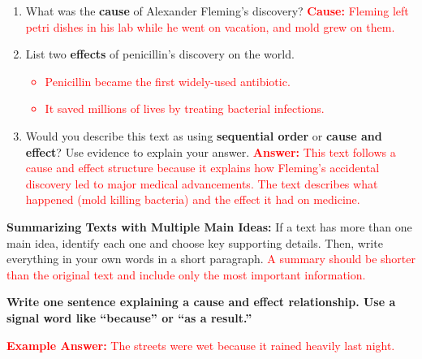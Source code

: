\documentclass[12pt]{article}
\begin{document}
\begin{tcolorbox}[colframe=black!60, colback=white, 
coltitle=black, colbacktitle=black!15, fonttitle=\bfseries\Large, 
title=Independent Practice, halign title=center, left=10pt, right=10pt, top=10pt, bottom=15pt]
\begin{enumerate}[itemsep=3em]
    \item What was the \textbf{cause} of Alexander Fleming’s discovery?  
    \textcolor{red}{\textbf{Cause:} Fleming left petri dishes in his lab while he went on vacation, and mold grew on them.}

    \item List two \textbf{effects} of penicillin’s discovery on the world.  
    \textcolor{red}{
        \begin{itemize}
            \item Penicillin became the first widely-used antibiotic.
            \item It saved millions of lives by treating bacterial infections.
        \end{itemize}
    }

    \item Would you describe this text as using \textbf{sequential order} or \textbf{cause and effect}? Use evidence to explain your answer.  
    \textcolor{red}{\textbf{Answer:} This text follows a cause and effect structure because it explains how Fleming’s accidental discovery led to major medical advancements. The text describes what happened (mold killing bacteria) and the effect it had on medicine.}
\end{enumerate}
\end{tcolorbox}

\vspace{1em}

\begin{tcolorbox}[colframe=black!40, colback=gray!5, 
coltitle=black, colbacktitle=black!20, fonttitle=\bfseries\Large, 
title=Additional Notes, halign title=center, left=5pt, right=5pt, top=5pt, bottom=15pt]
\textbf{Summarizing Texts with Multiple Main Ideas:}  
If a text has more than one main idea, identify each one and choose key supporting details. Then, write everything in your own words in a short paragraph.  
\textcolor{red}{A summary should be shorter than the original text and include only the most important information.}
\end{tcolorbox}

\vspace{1em}

\begin{tcolorbox}[colframe=black!60, colback=white, 
coltitle=black, colbacktitle=black!15, fonttitle=\bfseries\Large, 
title=Exit Ticket, halign title=center, left=10pt, right=10pt, top=10pt, bottom=15pt]
\textbf{Write one sentence explaining a cause and effect relationship. Use a signal word like “because” or “as a result.”}  

\textcolor{red}{\textbf{Example Answer:} The streets were wet because it rained heavily last night.}  
\end{tcolorbox}
\end{document}
